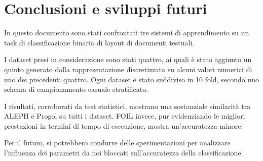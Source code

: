 \section{Conclusioni e sviluppi futuri}

In questo documento sono stati confrontati tre sistemi di apprendimento su un task di classificazione binaria di layout di documenti testuali.

I dataset presi in considerazione sono stati quattro, ai quali è stato aggiunto un quinto generato dalla rappresentazione discretizzata su alcuni valori numerici di uno dei precedenti quattro. Ogni dataset è stato suddiviso in 10 fold, secondo uno schema di campionamento casuale stratificato.

I risultati, corroborati da test statistici, mostrano una sostanziale similarità tra ALEPH e Progol su tutti i dataset. 
FOIL invece, pur evidenziando le migliori prestazioni in termini di tempo di esecuzione, mostra un'accuratezza minore.

Per il futuro, si potrebbero condurre delle sperimentazioni per analizzare l'influenza dei parametri da noi bloccati sull'accuratezza della classificazione.